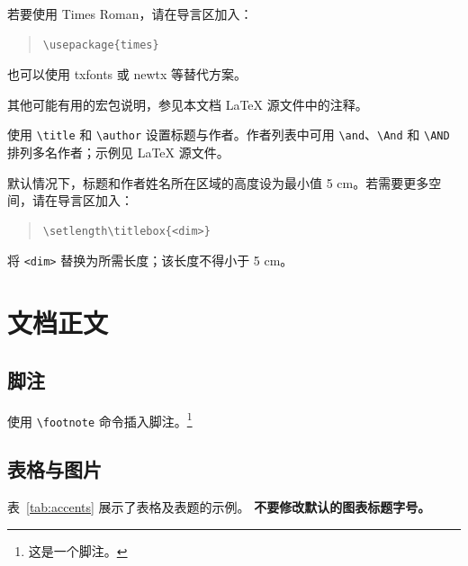 \documentclass[11pt]{article}
\begin{document}
若要使用 Times Roman，请在导言区加入：
\begin{quote}
\begin{verbatim}
\usepackage{times}
\end{verbatim}
\end{quote}
也可以使用 txfonts 或 newtx 等替代方案。

其他可能有用的宏包说明，参见本文档 \LaTeX{} 源文件中的注释。

使用 \verb|\title| 和 \verb|\author| 设置标题与作者。作者列表中可用 \verb|\and|、\verb|\And| 和 \verb|\AND| 排列多名作者；示例见 \LaTeX{} 源文件。

默认情况下，标题和作者姓名所在区域的高度设为最小值 5 cm。若需要更多空间，请在导言区加入：
\begin{quote}
\begin{verbatim}
\setlength\titlebox{<dim>}
\end{verbatim}
\end{quote}
将 \verb|<dim>| 替换为所需长度；该长度不得小于 5 cm。

\section{文档正文}

\subsection{脚注}

使用 \verb|\footnote| 命令插入脚注。\footnote{这是一个脚注。}

\subsection{表格与图片}

表~\ref{tab:accents} 展示了表格及表题的示例。
\textbf{不要修改默认的图表标题字号。}
\end{document}
